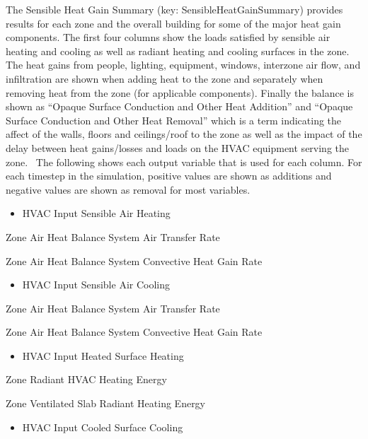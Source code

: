 The Sensible Heat Gain Summary (key: SensibleHeatGainSummary) provides results for each zone and the overall building for some of the major heat gain components. The first four columns show the loads satisfied by sensible air heating and cooling as well as radiant heating and cooling surfaces in the zone. The heat gains from people, lighting, equipment, windows, interzone air flow, and infiltration are shown when adding heat to the zone and separately when removing heat from the zone (for applicable components). Finally the balance is shown as ``Opaque Surface Conduction and Other Heat Addition'' and ``Opaque Surface Conduction and Other Heat Removal'' which is a term indicating the affect of the walls, floors and ceilings/roof to the zone as well as the impact of the delay between heat gains/losses and loads on the HVAC equipment serving the zone.~ The following shows each output variable that is used for each column. For each timestep in the simulation, positive values are shown as additions and negative values are shown as removal for most variables.

\begin{itemize}
\tightlist
\item
  HVAC Input Sensible Air Heating
\end{itemize}

Zone Air Heat Balance System Air Transfer Rate

Zone Air Heat Balance System Convective Heat Gain Rate

\begin{itemize}
\tightlist
\item
  HVAC Input Sensible Air Cooling
\end{itemize}

Zone Air Heat Balance System Air Transfer Rate

Zone Air Heat Balance System Convective Heat Gain Rate

\begin{itemize}
\tightlist
\item
  HVAC Input Heated Surface Heating
\end{itemize}

Zone Radiant HVAC Heating Energy

Zone Ventilated Slab Radiant Heating Energy

\begin{itemize}
\tightlist
\item
  HVAC Input Cooled Surface Cooling
\end{itemize}

